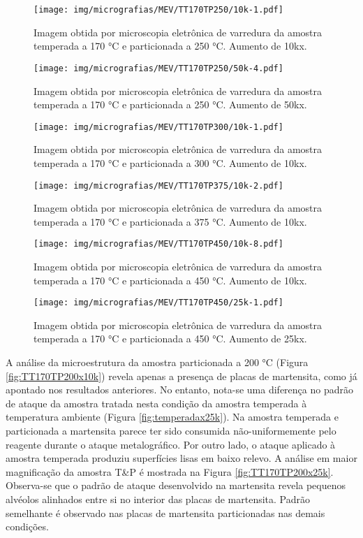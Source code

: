 \begin{figure}
	\texttt{[image: img/micrografias/MEV/TT170TP250/10k-1.pdf]}
	\caption{Imagem obtida por microscopia eletrônica de varredura da amostra temperada a 170 °C e particionada a 250 °C. Aumento de 10kx.}
	\label{fig:TT170TP250x10k}
\end{figure}

\begin{figure}
	\texttt{[image: img/micrografias/MEV/TT170TP250/50k-4.pdf]}
	\caption{Imagem obtida por microscopia eletrônica de varredura da amostra temperada a 170 °C e particionada a 250 °C. Aumento de 50kx.}
	\label{fig:TT170TP250x50k}
\end{figure}

\begin{figure}
	\texttt{[image: img/micrografias/MEV/TT170TP300/10k-1.pdf]}
	\caption{Imagem obtida por microscopia eletrônica de varredura da amostra temperada a 170 °C e particionada a 300 °C. Aumento de 10kx.}
	\label{fig:TT170TP300x10k}
\end{figure}

\begin{figure}
	\texttt{[image: img/micrografias/MEV/TT170TP375/10k-2.pdf]}
	\caption{Imagem obtida por microscopia eletrônica de varredura da amostra temperada a 170 °C e particionada a 375 °C. Aumento de 10kx.}
	\label{fig:TT170TP375x10k}
\end{figure}

\begin{figure}
	\texttt{[image: img/micrografias/MEV/TT170TP450/10k-8.pdf]}
	\caption{Imagem obtida por microscopia eletrônica de varredura da amostra temperada a 170 °C e particionada a 450 °C. Aumento de 10kx.}
	\label{fig:TT170TP450x10k}
\end{figure}

\begin{figure}
	\texttt{[image: img/micrografias/MEV/TT170TP450/25k-1.pdf]}
	\caption{Imagem obtida por microscopia eletrônica de varredura da amostra temperada a 170 °C e particionada a 450 °C. Aumento de 25kx.}
	\label{fig:TT170TP450x25k}
\end{figure}

A análise da microestrutura da amostra particionada a 200 °C (Figura \ref{fig:TT170TP200x10k}) revela apenas a presença de placas de martensita, como já apontado nos resultados anteriores. No entanto, nota-se uma diferença no padrão de ataque da amostra tratada nesta condição da amostra temperada à temperatura ambiente (Figura \ref{fig:temperadax25k}). Na amostra temperada e particionada a martensita parece ter sido consumida não-uniformemente pelo reagente durante o ataque metalográfico. Por outro lado, o ataque aplicado à amostra temperada produziu superfícies lisas em baixo relevo. A análise em maior magnificação da amostra T\&P é mostrada na Figura \ref{fig:TT170TP200x25k}. Observa-se que o padrão de ataque desenvolvido na martensita revela pequenos alvéolos alinhados entre si no interior das placas de martensita. Padrão semelhante é observado nas placas de martensita particionadas nas demais condições.

